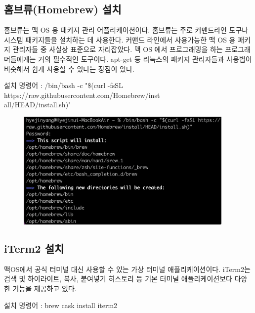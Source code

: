 \documentclass{article}
\begin{document}
\subsection{홈브류(Homebrew) 설치}
홈브류는 맥 OS 용 패키지 관리 어플리케이션이다.
홈브류는 주로 커맨드라인 도구나 시스템 패키지들을 설치하는 데 사용한다.
커맨드 라인에서 사용가능한 맥 OS 용 패키지 관리자들 중 사실상 표준으로 자리잡았다.
맥 OS 에서 프로그래밍을 하는 프로그래머들에게는 거의 필수적인 도구이다.
apt-get 등 리눅스의 패키지 관리자들과 사용법이 비슷해서 쉽게 사용할 수 있다는 장점이 있다.

\vspace{3mm}
\noindent
설치 명령어 : 
/bin/bash -c "\$(curl -fsSL https://raw.githubusercontent.com/Homebrew/inst\\all/HEAD/install.sh)"
\begin{figure}[!htbp]
	\begin{center}
		\includegraphics[width=300pt]{hw3_homebrew.png}
	\end{center}
\end{figure}

\subsection{iTerm2 설치}
맥OS에서 공식 터미널 대신 사용할 수 있는 가상 터미널 애플리케이션이다.
iTerm2는 검색 및 하이라이트, 복사, 붙여넣기 히스토리 등
기본 터미널 애플리케이션보다 다양한 기능을 제공하고 있다.

\vspace{3mm}
\noindent
설치 명령어 : 
brew cask install iterm2

\newpage
\end{document}
